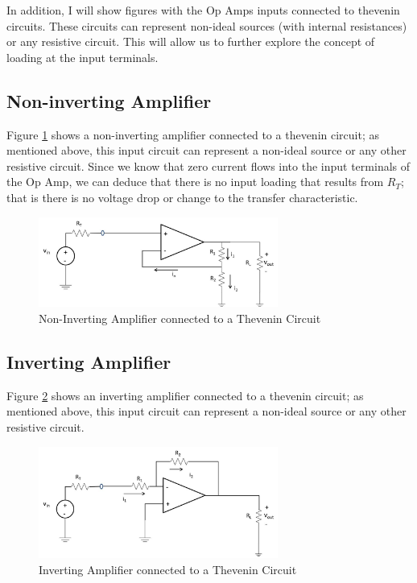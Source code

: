 \documentclass{handout}
\begin{document}
In addition, I will show figures with the Op Amps inputs connected to thevenin circuits.  These circuits can represent non-ideal sources (with internal resistances) or any resistive circuit.  This will allow us to further explore the concept of loading at the input terminals. 

\newpage
\clearpage
\pagebreak

\subsection{Non-inverting Amplifier}
Figure \ref{fig: NonInvertingAmplifier} shows a non-inverting amplifier connected to a thevenin circuit; as mentioned above, this input circuit can represent a non-ideal source or any other resistive circuit.  Since we know that zero current flows into the input terminals of the Op Amp, we can deduce that there is no input loading that results from $R_T$; that is there is no voltage drop or change to the transfer characteristic.

\begin{figure} [h!]
\centering
\includegraphics[width=0.7\textwidth]{NonInvertingAmplifier.jpg}
\caption{Non-Inverting Amplifier connected to a Thevenin Circuit}
\label{fig: NonInvertingAmplifier}
\end{figure}

\subsection{Inverting Amplifier}
Figure \ref{fig: InvertingAmplifier} shows an inverting amplifier connected to a thevenin circuit; as mentioned above, this input circuit can represent a non-ideal source or any other resistive circuit.  

\begin{figure} [h!]
\centering
\includegraphics[width=0.7\textwidth]{InvertingAmplifier.jpg}
\caption{Inverting Amplifier connected to a Thevenin Circuit}
\label{fig: InvertingAmplifier}
\end{figure}
\end{document}

